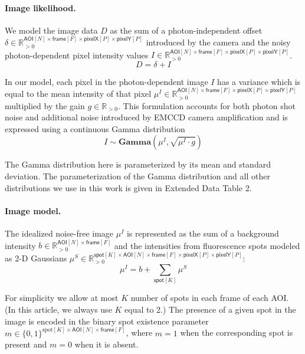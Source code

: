 \paragraph{Image likelihood.} We model the image data $D$ as the sum of a photon-independent offset $\delta \in \mathbb{R}_{>0}^{\mathsf{AOI}[N] \times \mathsf{frame}[F] \times \mathsf{pixelX}[P] \times \mathsf{pixelY}[P]}$ introduced by the camera and the noisy photon-dependent pixel intensity values $I \in \mathbb{R}_{>0}^{\mathsf{AOI}[N] \times \mathsf{frame}[F] \times \mathsf{pixelX}[P] \times \mathsf{pixelY}[P]}$.
%
\begin{equation}
    D = \delta + I
\end{equation}

In our model, each pixel in the photon-dependent image $I$ has a  variance which is equal to  the mean intensity of that pixel $\mu^I \in \mathbb{R}_{>0}^{\mathsf{AOI}[N] \times \mathsf{frame}[F] \times \mathsf{pixelX}[P] \times \mathsf{pixelY}[P]}$ multiplied by the gain $g \in \mathbb{R}_{>0}$. This formulation accounts for both photon shot noise and additional noise introduced by EMCCD camera amplification \cite{Van_Vliet1998-jk} and is expressed using a continuous Gamma distribution
%
\begin{equation}
    I \sim \mathbf{Gamma} (\mu^I, \sqrt{\mu^I \cdot g})
\end{equation}

The Gamma distribution here is parameterized by its mean and standard deviation. The parameterization of the Gamma distribution and all other distributions we use in this work is given in Extended Data Table 2.

\paragraph{Image model.} The idealized noise-free image $\mu^I$ is represented  as the sum of a background intensity $b \in \mathbb{R}_{>0}^{\mathsf{AOI}[N] \times \mathsf{frame}[F]}$ and the intensities from fluorescence spots modeled as  2-D Gaussians $\mu^S \in \mathbb{R}_{>0}^{\mathsf{spot}[K] \times \mathsf{AOI}[N] \times \mathsf{frame}[F] \times \mathsf{pixelX}[P] \times \mathsf{pixelY}[P]}$:
%
\begin{equation}
    \mu^I = b + \sum_{\mathsf{spot}[K]} \mu^S
\end{equation}

\noindent
For simplicity we allow at most $K$ number of spots in each frame of each AOI.  (In this article, we always use $K$ equal to 2.)  The presence of a given spot in the image is encoded in the binary spot existence parameter $m \in \{ 0, 1 \}^{\mathrm{spot}[K] \times \mathsf{AOI}[N] \times \mathsf{frame}[F]}$, where $m = 1$ when the corresponding spot is present and $m = 0$ when it is absent.



